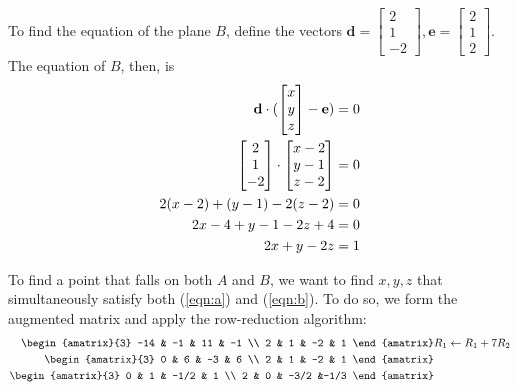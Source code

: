 \documentclass{article}
\begin{document}
\begin{enumerate}
To find the equation of the plane $B$, define the vectors \(
 \mathbf{d} = \begin{bmatrix} 2 \\ 1 \\ -2 \end{bmatrix},
 \mathbf{e} = \begin{bmatrix} 2 \\ 1 \\ 2 \end{bmatrix}
\).  The equation of $B$, then, is
\begin{align}
 \mathbf{d} \cdot
 (\begin{bmatrix}
   x \\ y \\ z
  \end{bmatrix} - \mathbf{e}) &= 0 \notag \\
 \begin{bmatrix} 2 \\ 1 \\ -2 \end{bmatrix} \cdot
 \begin{bmatrix} x - 2 \\ y - 1 \\ z - 2 \end{bmatrix} &= 0 \notag \\
 2(x - 2) + (y - 1) - 2(z - 2) &= 0 \notag \\
 2x - 4 + y - 1 - 2z + 4 &= 0 \notag \\
 2x + y - 2z &= 1 \label{eqn:b}
\end{align}

To find a point that falls on both $A$ and $B$, we want to find
$x, y, z$ that simultaneously satisfy both (\ref{eqn:a}) and 
(\ref{eqn:b}).  To do so, we form the augmented matrix and apply
the row-reduction algorithm:
\begin{align}
 \begin{amatrix}{3}
  -14 & -1 & 11 & -1 \\
  2 & 1 & -2 & 1
 \end{amatrix}&
  R_1 \leftarrow R_1 + 7R_2
 \nonumber \\
 \begin{amatrix}{3}
  0 & 6 & -3 & 6 \\
  2 & 1 & -2 & 1
 \end{amatrix}&
 \nonumber \\
 \begin{amatrix}{3}
  0 & 1 & -1/2 & 1 \\
  2 & 0 & -3/2 &-1/3
 \end{amatrix}&
 \nonumber
\end{align}


\end{enumerate}
\end{document}
